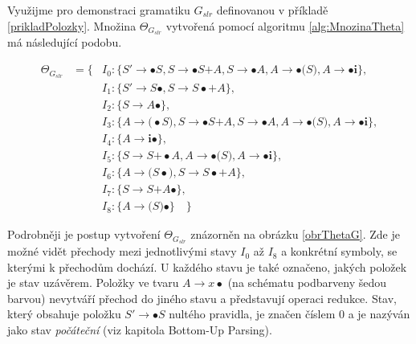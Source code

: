 \begin{priklad} \label{prikladTheta}
  Využijme pro demonstraci gramatiku $G_{slr}$ definovanou v příkladě \ref{prikladPolozky}. Množina $\Theta_{G_{slr}}$
  vytvořená pomocí algoritmu \ref{alg:MnozinaTheta} má následující podobu.

  \begin{eqnarray*}
    \Theta_{G_{slr}} & = \{ & I_0\!:\{ S' \rightarrow \bullet S, S \rightarrow \bullet S \textbf{+} A, S \rightarrow \bullet A, A \rightarrow \bullet \textbf{(} S \textbf{)}, A \rightarrow \bullet \textbf{i}\}, \\
                     &      & I_1\!:\{ S' \rightarrow S \bullet, S \rightarrow S\!\bullet\!\textbf{+} A \}, \\
                     &      & I_2\!:\{ S \rightarrow A \bullet \}, \\
                     &      & I_3\!:\{ A \rightarrow \textbf{(}\!\bullet\!S \textbf{)}, S \rightarrow \bullet S \textbf{+} A, S \rightarrow \bullet A, A \rightarrow \bullet \textbf{(} S \textbf{)}, A \rightarrow \bullet \textbf{i} \}, \\
                     &      & I_4\!:\{ A \rightarrow \textbf{i} \bullet \}, \\
                     &      & I_5\!:\{ S \rightarrow S \textbf{+}\!\bullet\!A, A \rightarrow \bullet \textbf{(} S \textbf{)}, A \rightarrow \bullet \textbf{i} \}, \\
                     &      & I_6\!:\{ A \rightarrow \textbf{(} S\!\bullet\!\textbf{)}, S \rightarrow S\!\bullet\!\textbf{+} A \}, \\
                     &      & I_7\!:\{ S \rightarrow S \textbf{+} A \bullet \}, \\
                     &      & I_8\!:\{ A \rightarrow \textbf{(} S \textbf{)} \bullet \} \quad \}
  \end{eqnarray*}

  Podrobněji je postup vytvoření $\Theta_{G_{slr}}$ znázorněn na obrázku \ref{obrThetaG}. Zde je možné vidět přechody mezi jednotlivými stavy $I_0$ až $I_8$ a
  konkrétní symboly, se kterými k přechodům dochází. U každého stavu je také označeno, jakých položek je stav uzávěrem.
  Položky ve tvaru $A \rightarrow x \bullet$ (na schématu podbarveny šedou barvou) nevytváří přechod do jiného stavu a představují operaci redukce.
  Stav, který obsahuje položku $S' \rightarrow \bullet S$ nultého pravidla, je značen číslem $0$ a je nazýván jako stav \emph{počáteční} (viz \cite{VYPa:2022} kapitola Bottom-Up Parsing).


\end{priklad}

